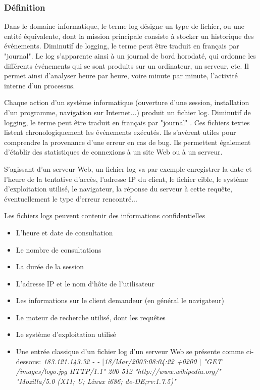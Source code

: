\subsubsection{Définition}

Dans le domaine informatique, le terme log désigne un type de fichier, ou une entité équivalente, dont la mission principale consiste
à stocker un historique des événements. Diminutif de logging, le terme peut être traduit en français par "journal".
Le log s'apparente ainsi à un journal de bord horodaté, qui ordonne les différents événements qui se sont produits sur un ordinateur,
 un serveur, etc. Il permet ainsi d'analyser heure par heure, voire minute par minute, l'activité interne d'un processus.


Chaque action d'un système informatique (ouverture d'une session, installation d'un programme, navigation sur Internet...) produit
un fichier log. Diminutif de logging, le terme peut être traduit en français par "journal" . Ces fichiers textes listent
chronologiquement les événements exécutés. Ils s'avèrent utiles pour comprendre la provenance d'une erreur en cas de bug.
Ils permettent également d'établir des statistiques de connexions à un site Web ou à un serveur.


S'agissant d'un serveur Web, un fichier log va par exemple enregistrer la date et l'heure de la tentative d'accès, l'adresse IP du client,
le fichier cible, le système d'exploitation utilisé, le navigateur, la réponse du serveur à cette requête, éventuellement le type
 d'erreur rencontré...\newline

Les fichiers logs peuvent contenir des informations confidentielles

\begin{itemize}
	\item L’heure et date de consultation
	\item Le nombre de consultations
	\item La durée de la session
	\item L’adresse IP et le nom d‘hôte de l’utilisateur
	\item Les informations sur le client demandeur (en général le navigateur)
	\item Le moteur de recherche utilisé, dont les requêtes
	\item Le système d’exploitation utilisé
	\item Une entrée classique d’un fichier log d’un serveur Web se présente comme ci-dessous: \textit{183.121.143.32 - - $ [ $18/Mar/2003:08:04:22 +0200 $ ] $ "GET /images/logo.jpg HTTP/1.1" 200 512 "http://www.wikipedia.org/" "Mozilla/5.0 (X11; U; Linux i686; de-DE;rv:1.7.5)"}
\end{itemize}
